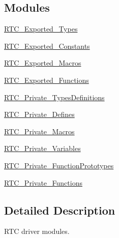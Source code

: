 \subsection*{Modules}
\begin{DoxyCompactItemize}
\item 
\hyperlink{group___r_t_c___exported___types}{R\+T\+C\+\_\+\+Exported\+\_\+\+Types}
\item 
\hyperlink{group___r_t_c___exported___constants}{R\+T\+C\+\_\+\+Exported\+\_\+\+Constants}
\item 
\hyperlink{group___r_t_c___exported___macros}{R\+T\+C\+\_\+\+Exported\+\_\+\+Macros}
\item 
\hyperlink{group___r_t_c___exported___functions}{R\+T\+C\+\_\+\+Exported\+\_\+\+Functions}
\item 
\hyperlink{group___r_t_c___private___types_definitions}{R\+T\+C\+\_\+\+Private\+\_\+\+Types\+Definitions}
\item 
\hyperlink{group___r_t_c___private___defines}{R\+T\+C\+\_\+\+Private\+\_\+\+Defines}
\item 
\hyperlink{group___r_t_c___private___macros}{R\+T\+C\+\_\+\+Private\+\_\+\+Macros}
\item 
\hyperlink{group___r_t_c___private___variables}{R\+T\+C\+\_\+\+Private\+\_\+\+Variables}
\item 
\hyperlink{group___r_t_c___private___function_prototypes}{R\+T\+C\+\_\+\+Private\+\_\+\+Function\+Prototypes}
\item 
\hyperlink{group___r_t_c___private___functions}{R\+T\+C\+\_\+\+Private\+\_\+\+Functions}
\end{DoxyCompactItemize}


\subsection{Detailed Description}
R\+TC driver modules. 

